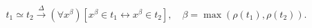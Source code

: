 $$t_1 \simeq t_2 \xrightarrow{\Delta} (\forall x^\beta)[x^\beta \in t_1 \leftrightarrow x^\beta \in t_2], \quad \beta = \max(\rho(t_1), \rho(t_2)).$$
